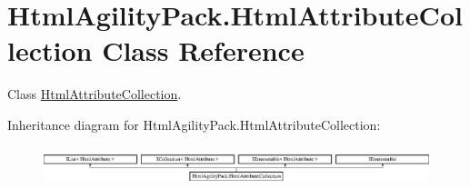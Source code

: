 \hypertarget{class_html_agility_pack_1_1_html_attribute_collection}{}\section{Html\+Agility\+Pack.\+Html\+Attribute\+Collection Class Reference}
\label{class_html_agility_pack_1_1_html_attribute_collection}


Class \hyperlink{class_html_agility_pack_1_1_html_attribute_collection}{Html\+Attribute\+Collection}.  


Inheritance diagram for Html\+Agility\+Pack.\+Html\+Attribute\+Collection\+:\begin{figure}[H]
\begin{center}
\leavevmode
\includegraphics[height=1.176471cm]{class_html_agility_pack_1_1_html_attribute_collection}
\end{center}
\end{figure}
